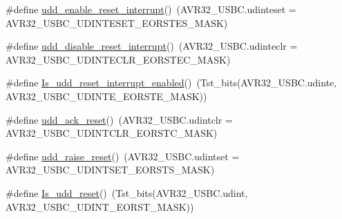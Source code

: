 \begin{DoxyCompactItemize}
\item 
\#define \hyperlink{group__udd__group_gaa4f338d7c02eb47691d55ea26a0b32d7}{udd\-\_\-enable\-\_\-reset\-\_\-interrupt}()~(\-A\-V\-R32\-\_\-\-U\-S\-B\-C.\-udinteset = \-A\-V\-R32\-\_\-\-U\-S\-B\-C\-\_\-\-U\-D\-I\-N\-T\-E\-S\-E\-T\-\_\-\-E\-O\-R\-S\-T\-E\-S\-\_\-\-M\-A\-S\-K)
\item 
\#define \hyperlink{group__udd__group_ga4f19c394e2352deb16c13e15c34c59ff}{udd\-\_\-disable\-\_\-reset\-\_\-interrupt}()~(\-A\-V\-R32\-\_\-\-U\-S\-B\-C.\-udinteclr = \-A\-V\-R32\-\_\-\-U\-S\-B\-C\-\_\-\-U\-D\-I\-N\-T\-E\-C\-L\-R\-\_\-\-E\-O\-R\-S\-T\-E\-C\-\_\-\-M\-A\-S\-K)
\item 
\#define \hyperlink{group__udd__group_gae0697533a9d3b806351a6a075100dd9f}{\-Is\-\_\-udd\-\_\-reset\-\_\-interrupt\-\_\-enabled}()~(\-Tst\-\_\-bits(\-A\-V\-R32\-\_\-\-U\-S\-B\-C.\-udinte, \-A\-V\-R32\-\_\-\-U\-S\-B\-C\-\_\-\-U\-D\-I\-N\-T\-E\-\_\-\-E\-O\-R\-S\-T\-E\-\_\-\-M\-A\-S\-K))
\item 
\#define \hyperlink{group__udd__group_gae28a4338a4679d081090a536f7bd3ee1}{udd\-\_\-ack\-\_\-reset}()~(\-A\-V\-R32\-\_\-\-U\-S\-B\-C.\-udintclr = \-A\-V\-R32\-\_\-\-U\-S\-B\-C\-\_\-\-U\-D\-I\-N\-T\-C\-L\-R\-\_\-\-E\-O\-R\-S\-T\-C\-\_\-\-M\-A\-S\-K)
\item 
\#define \hyperlink{group__udd__group_ga6c25f895374748a59eaa9a84356a5d58}{udd\-\_\-raise\-\_\-reset}()~(\-A\-V\-R32\-\_\-\-U\-S\-B\-C.\-udintset = \-A\-V\-R32\-\_\-\-U\-S\-B\-C\-\_\-\-U\-D\-I\-N\-T\-S\-E\-T\-\_\-\-E\-O\-R\-S\-T\-S\-\_\-\-M\-A\-S\-K)
\item 
\#define \hyperlink{group__udd__group_ga8bcb98dbb6f1255a0f25ae73035927db}{\-Is\-\_\-udd\-\_\-reset}()~(\-Tst\-\_\-bits(\-A\-V\-R32\-\_\-\-U\-S\-B\-C.\-udint, \-A\-V\-R32\-\_\-\-U\-S\-B\-C\-\_\-\-U\-D\-I\-N\-T\-\_\-\-E\-O\-R\-S\-T\-\_\-\-M\-A\-S\-K))
\end{DoxyCompactItemize}
